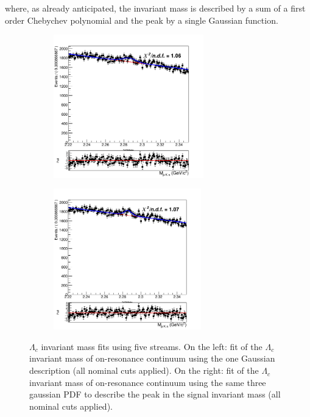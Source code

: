 where, as already anticipated, the invariant mass is described by a sum of a first order Chebychev polynomial and the peak by a single Gaussian function.

\begin{figure}[H]
  \begin{subfigure}{7cm}
    \centering\includegraphics[width=6.5cm]{04-chargedCorrBtoLambda/figs/stream01234Continuum_charged_corrLambdaC_oneGaussianInvMfit.png}
   
    \label{fig:charged_corrLambdaC_InvM_continuumMC_1Gaussianfit}
  \end{subfigure}
  \begin{subfigure}{7cm}
    \centering\includegraphics[width=6.4cm]{04-chargedCorrBtoLambda/figs/stream01234Continuum_charged_corrLambdaC_3GaussianInvMfit.png}
    \label{fig:charged_corrLambdaC_InvM_continuumMC_3Gaussianfit}
  \end{subfigure}
\caption{$\Lambda_c$ invariant mass fits using five streams. On the left: fit of the $\Lambda_c$ invariant mass of on-resonance continuum using the one Gaussian description (all nominal cuts applied). On the right: fit of the $\Lambda_c$ invariant mass of on-resonance continuum using the same three gaussian PDF to describe the peak in the signal invariant mass (all nominal cuts applied). }
\end{figure} 



